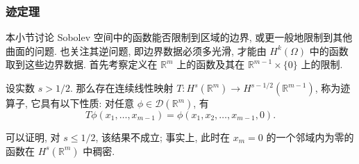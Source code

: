 \subsubsection{迹定理}\label{subsec:sobolev-trace-theorem}

本小节讨论 Sobolev 空间中的函数能否限制到区域的边界, 或更一般地限制到其他曲面的问题. 也关注其逆问题, 即边界数据必须多光滑, 才能由 $H^k(\Omega)$ 中的函数取到这些边界数据. 首先考察定义在 $\mathbb{R}^m$ 上的函数及其在 $\mathbb{R}^{m-1}\times\{0\}$ 上的限制.

\begin{Theorem}
\label{thm:hyperplane-sobolev-trace}
设实数 $s>1/2$. 那么存在连续线性映射 $T:H^s(\mathbb{R}^m)\to H^{s-1/2}(\mathbb{R}^{m-1})$, 称为迹算子, 它具有以下性质: 对任意 $\phi\in\mathcal{D}(\mathbb{R}^m)$, 有
\begin{equation}\label{eq:hyperplane-trace-test-function-restriction}
T\phi(x_1,\ldots,x_{m-1})=\phi(x_1,x_2,\ldots,x_{m-1},0).
\end{equation}

\end{Theorem}

可以证明, 对 $s\leq1/2$, 该结果不成立; 事实上, 此时在 $x_m=0$ 的一个邻域内为零的函数在 $H^s(\mathbb{R}^m)$ 中稠密.


